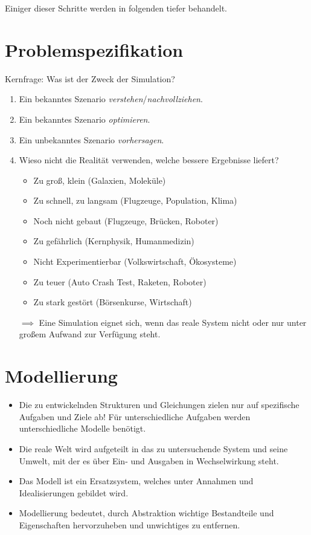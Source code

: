     Einiger dieser Schritte werden in folgenden tiefer behandelt.

    \section{Problemspezifikation} %
        \label{sec:simproblemspez}
    
        Kernfrage: Was ist der Zweck der Simulation?
        
        \begin{enumerate}
        	\item Ein bekanntes Szenario \textit{verstehen}/\textit{nachvollziehen}.
        	\item Ein bekanntes Szenario \textit{optimieren}.
        	\item Ein unbekanntes Szenario \textit{vorhersagen}.
        	\item Wieso nicht die Realität verwenden, welche bessere Ergebnisse liefert?
            	\begin{itemize}
            		\item Zu groß, klein (Galaxien, Moleküle)
            		\item Zu schnell, zu langsam (Flugzeuge, Population, Klima)
            		\item Noch nicht gebaut (Flugzeuge, Brücken, Roboter)
            		\item Zu gefährlich (Kernphysik, Humanmedizin)
            		\item Nicht Experimentierbar (Volkswirtschaft, Ökosysteme)
            		\item Zu teuer (Auto Crash Test, Raketen, Roboter)
            		\item Zu stark gestört (Börsenkurse, Wirtschaft)
            	\end{itemize}
            \item[\( \implies \)] Eine Simulation eignet sich, wenn das reale System nicht oder nur unter großem Aufwand zur Verfügung steht.
        \end{enumerate}

    \section{Modellierung} %
        \label{sec:simmodelling}
    
        \begin{itemize}
        	\item Die zu entwickelnden Strukturen und Gleichungen zielen nur auf spezifische Aufgaben und Ziele ab! Für unterschiedliche Aufgaben werden unterschiedliche Modelle benötigt.
        	\item Die reale Welt wird aufgeteilt in das zu untersuchende System und seine Umwelt, mit der es über Ein- und Ausgaben in Wechselwirkung steht.
        	\item Das Modell ist ein Ersatzsystem, welches unter Annahmen und Idealisierungen gebildet wird.
        	\item Modellierung bedeutet, durch Abstraktion wichtige Bestandteile und Eigenschaften hervorzuheben und unwichtiges zu entfernen.
        \end{itemize}

